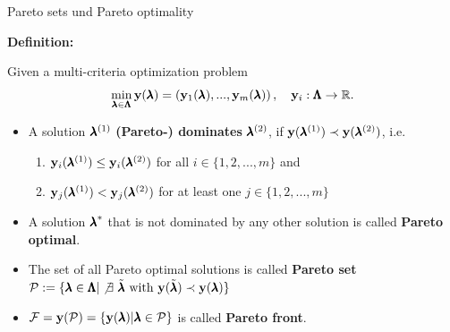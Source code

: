\begin{frame}{Pareto sets und Pareto optimality}

\textbf{Definition:}

Given a multi-criteria optimization problem
    $$\min_{\pmb{\lambda} \in \pmb{\Lambda}} \mathbf{y}(\pmb{\lambda}) = \left(\mathbf{y}_1(\pmb{\lambda}), ..., \mathbf{y}_m(\pmb{\lambda})\right), \quad \mathbf{y}_i: \pmb{\Lambda} \to \mathbb{R}.$$ %

\begin{itemize}
    \item A solution $\pmb{\lambda}^{(1)}$ \textbf{(Pareto-) dominates} $\pmb{\lambda}^{(2)}$, if $\mathbf{y}(\pmb{\lambda}^{(1)}) \prec \mathbf{y}(\pmb{\lambda}^{(2)})$, i.e.
\begin{enumerate}
    \item $\mathbf{y}_i(\pmb{\lambda}^{(1)}) \le \mathbf{y}_i(\pmb{\lambda}^{(2)})$ for all $i \in \{1, 2, ..., m\}$ and
    \item $\mathbf{y}_j(\pmb{\lambda}^{(1)}) < \mathbf{y}_j(\pmb{\lambda}^{(2)})$ for at least one $j \in \{1, 2, ..., m\}$
\end{enumerate}
\vspace*{0.1cm}
\item A solution ${\pmb{\lambda}}^*$ that is not dominated by any other solution is called \textbf{Pareto optimal}.
\vspace*{0.1cm}
\item The set of all Pareto optimal solutions is called \textbf{Pareto set} $\mathcal{P} := \{\pmb{\lambda} \in \pmb{\Lambda} |\not \exists ~\tilde{\pmb{\lambda}} \text{ with } \mathbf{y}(\tilde{\pmb{\lambda}}) \prec \mathbf{y}(\pmb{\lambda})\}$
\item $\mathcal{F} = \mathbf{y}(\mathcal{P}) = \{\mathbf{y}(\pmb{\lambda}) | \pmb{\lambda} \in \mathcal{P}\}$ is called \textbf{Pareto front}.
\end{itemize}

\end{frame}


